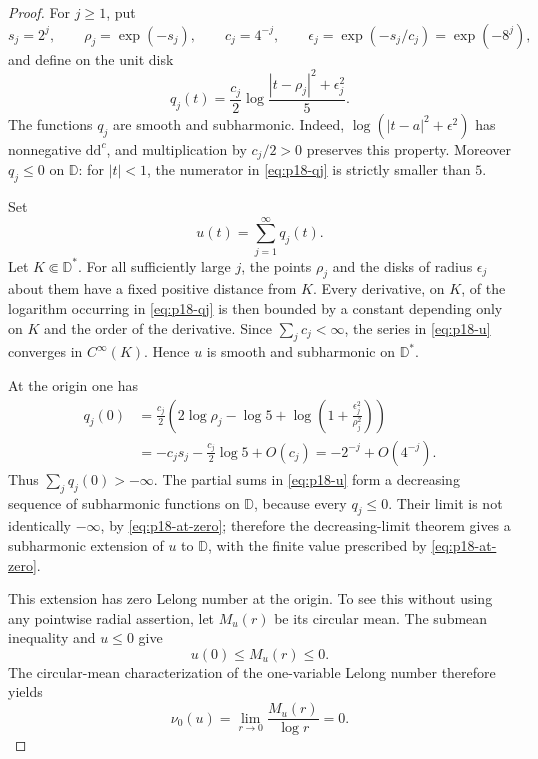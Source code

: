 \begin{proof}
For \(j\geq1\), put
\[
 s_j=2^j,\qquad
 \rho_j=\exp(-s_j),\qquad
 c_j=4^{-j},\qquad
 \epsilon_j=\exp(-s_j/c_j)=\exp(-8^j),
\]
and define on the unit disk
\[
 q_j(t)=\frac{c_j}{2}
   \log\frac{|t-\rho_j|^2+\epsilon_j^2}{5}.
\tag{1}\label{eq:p18-qj}
\]
The functions \(q_j\) are smooth and subharmonic.  Indeed,
\(\log(|t-a|^2+\epsilon^2)\) has nonnegative
\(\mathrm d\mathrm d^c\), and multiplication by \(c_j/2>0\)
preserves this property.  Moreover \(q_j\leq0\) on \(\mathbb D\):
for \(|t|<1\), the numerator in \eqref{eq:p18-qj} is strictly smaller
than \(5\).

Set
\[
                         u(t)=\sum_{j=1}^{\infty}q_j(t).
\tag{2}\label{eq:p18-u}
\]
Let \(K\Subset\mathbb D^*\).  For all sufficiently large \(j\), the
points \(\rho_j\) and the disks of radius \(\epsilon_j\) about them
have a fixed positive distance from \(K\).  Every derivative, on \(K\),
of the logarithm occurring in \eqref{eq:p18-qj} is then bounded by a
constant depending only on \(K\) and the order of the derivative.
Since \(\sum_jc_j<\infty\), the series in \eqref{eq:p18-u} converges in
\(C^\infty(K)\).  Hence \(u\) is smooth and subharmonic on
\(\mathbb D^*\).

At the origin one has
\[
\begin{aligned}
 q_j(0)
 &=
 \frac{c_j}{2}
 \left(
  2\log\rho_j-\log5+
  \log\left(1+\frac{\epsilon_j^2}{\rho_j^2}\right)
 \right)\\
 &=-c_js_j-\frac{c_j}{2}\log5+O(c_j)
  =-2^{-j}+O(4^{-j}).
\end{aligned}
\tag{3}\label{eq:p18-at-zero}
\]
Thus \(\sum_jq_j(0)>-\infty\).  The partial sums in
\eqref{eq:p18-u} form a decreasing sequence of subharmonic functions on
\(\mathbb D\), because every \(q_j\leq0\).  Their limit is not
identically \(-\infty\), by \eqref{eq:p18-at-zero}; therefore the
decreasing-limit theorem gives a subharmonic extension of \(u\) to
\(\mathbb D\), with the finite value prescribed by
\eqref{eq:p18-at-zero}.

This extension has zero Lelong number at the origin.  To see this without
using any pointwise radial assertion, let \(M_u(r)\) be its circular
mean.  The submean inequality and \(u\leq0\) give
\[
                         u(0)\leq M_u(r)\leq0.
\]
The circular-mean characterization of the one-variable Lelong number
therefore yields
\[
                       \nu_0(u)
                       =\lim_{r\to0}\frac{M_u(r)}{\log r}=0.
\tag{4}\label{eq:p18-zero-lelong}
\]


\end{proof}
